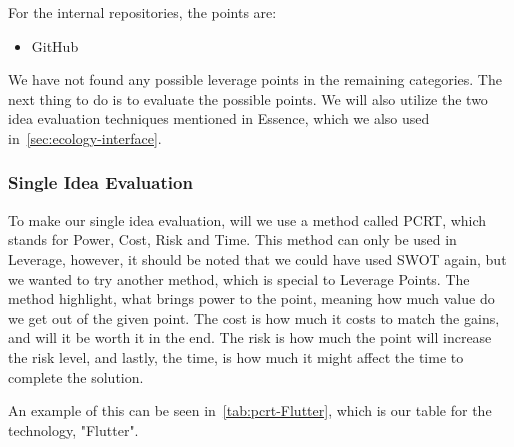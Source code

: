 For the internal repositories, the points are:

\begin{itemize}
    \item GitHub
\end{itemize}

We have not found any possible leverage points in the remaining categories.
The next thing to do is to evaluate the possible points. 
We will also utilize the two idea evaluation techniques mentioned in Essence, which we also used in~\autoref{sec:ecology-interface}.

\subsubsection{Single Idea Evaluation}
To make our single idea evaluation, will we use a method called PCRT, which stands for Power, Cost, Risk and Time.
This method can only be used in Leverage, however, it should be noted that we could have used SWOT again, but we wanted to try another method, which is special to Leverage Points.
The method highlight, what brings power to the point, meaning how much value do we get out of the given point.
The cost is how much it costs to match the gains, and will it be worth it in the end.
The risk is how much the point will increase the risk level, and lastly, the time, is how much it might affect the time to complete the solution.

An example of this can be seen in~\autoref{tab:pcrt-Flutter}, which is our table for the technology, "Flutter".

\begin{table}[h]
    \centering
    \caption{PCRT analysis of Flutter in technologies.}
    \label{tab:pcrt-Flutter}
\end{table}

